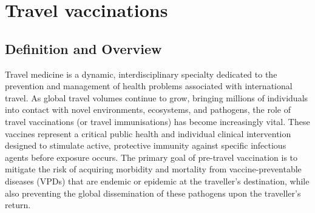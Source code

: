 \chapter{Travel vaccinations}

\section*{Definition and Overview}
Travel medicine is a dynamic, interdisciplinary specialty dedicated to the prevention and management of health problems associated with international travel. As global travel volumes continue to grow, bringing millions of individuals into contact with novel environments, ecosystems, and pathogens, the role of travel vaccinations (or travel immunisations) has become increasingly vital. These vaccines represent a critical public health and individual clinical intervention designed to stimulate active, protective immunity against specific infectious agents before exposure occurs. The primary goal of pre-travel vaccination is to mitigate the risk of acquiring morbidity and mortality from vaccine-preventable diseases (VPDs) that are endemic or epidemic at the traveller's destination, while also preventing the global dissemination of these pathogens upon the traveller's return.

